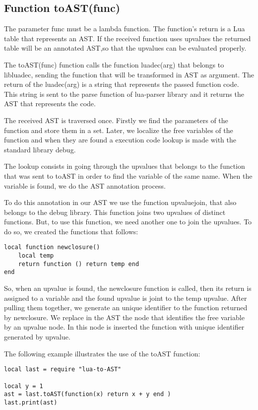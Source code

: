 \documentclass[english]{llncs}
\begin{document}
\subsection{Function toAST(func) }

The parameter func must be a lambda function.
The function's return is a Lua table that represents an AST.
If the received function uses upvalues the returned table will be an annotated AST,so that the upvalues can be evaluated properly.

The toAST(func) function calls the function luadec(arg) that belongs to libluadec, sending the function that will be transformed in AST as argument.
The return of the luadec(arg) is a string that represents the passed function code.
This string is sent to the parse function of lua-parser library and it returns the AST that represents the code.

The received AST is traversed once.
Firstly we find the parameters of the function and store them in a set.
Later, we localize the free variables of the  function and when they are found a execution code lookup is made with the standard library debug.

The lookup consists in going through the upvalues that belongs to the function that was sent to toAST in order to find the variable of the same name.
When the variable is found, we do the AST annotation process.

To do this annotation in our AST we use the function upvaluejoin, that also belongs to the debug library.
This function joins two upvalues of distinct functions.
But, to use this function, we need another one to join the upvalues. To do so, we created the functions that follows:


\begin{verbatim}
local function newclosure()
    local temp
    return function () return temp end
end
\end{verbatim}

So, when an upvalue is found, the newclosure function is called, then its return is assigned to a variable and the found upvalue is joint to the temp upvalue.
After pulling them together, we generate an unique identifier to the function returned by newclosure.
We replace in the AST the node that identifies the free variable by an upvalue node.
In this node is inserted the function with unique identifier generated by upvalue.


The following example illustrates the use of the toAST function:


\begin{verbatim}
local last = require "lua-to-AST"

local y = 1
ast = last.toAST(function(x) return x + y end )
last.print(ast)
\end{verbatim}
\end{document}
